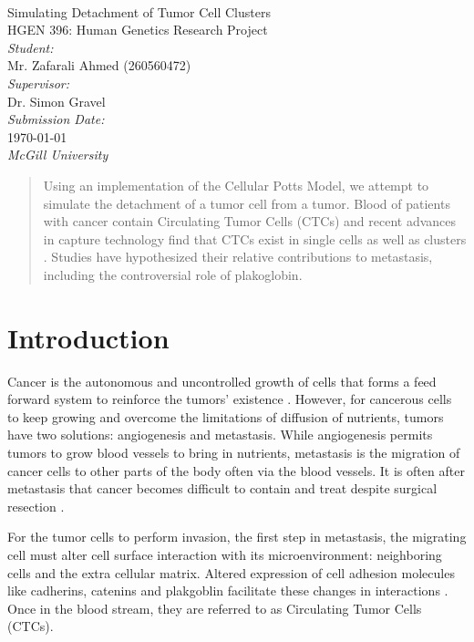 \documentclass[12pt]{article}
\begin{document}
\begin{titlepage}
	\begin{center}
		~\\[2.5cm]
		{\Huge Simulating Detachment of Tumor Cell Clusters}\\[1.5cm]
		{\Large HGEN 396: Human Genetics Research Project}\\[7.5cm]
		\emph{Student:}\\
		Mr. Zafarali Ahmed (260560472)\\[1.0cm]
		\emph{Supervisor:}\\
		Dr. Simon Gravel\\[1.0cm]
		\emph{Submission Date:}\\
		\today\\
		\emph{McGill University}
	\end{center}
\end{titlepage}

\begin{abstract}
Using an implementation of the Cellular Potts Model, we attempt to simulate the detachment of a tumor cell from a tumor. Blood of patients with cancer contain Circulating Tumor Cells (CTCs) and recent advances in capture technology find that CTCs exist in single cells as well as clusters \cite{Aceto2014}. Studies have hypothesized their relative contributions to metastasis, including the controversial role of plakoglobin. 
\end{abstract}

\section{Introduction}
Cancer is the autonomous and uncontrolled growth of cells that forms a feed forward system to reinforce the tumors’ existence \cite{hallmarks}. However, for cancerous cells to keep growing and overcome the limitations of diffusion of nutrients, tumors have two solutions: angiogenesis and metastasis. While angiogenesis permits tumors to grow blood vessels to bring in nutrients, metastasis is the migration of cancer cells to other parts of the body often via the blood vessels. It is often after metastasis that cancer becomes difficult to contain and treat despite surgical resection \cite{Hatzikirou2012}.

For the tumor cells to perform invasion, the first step in metastasis, the migrating cell must alter cell surface interaction with its microenvironment: neighboring cells and the extra cellular matrix. Altered expression of cell adhesion molecules like cadherins, catenins and plakgoblin facilitate these changes in interactions \cite{Aktary2012}. Once in the blood stream, they are referred to as Circulating Tumor Cells (CTCs).
\end{document}
